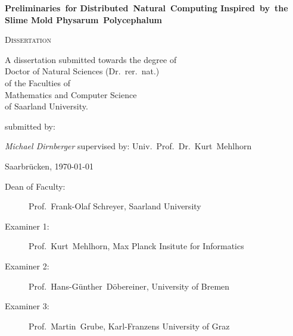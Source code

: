 
\begin{titlepage}
	\centering
	\null\vfill

	{\huge\bfseries Preliminaries~for Distributed~Natural~Computing Inspired~by~the Slime Mold Physarum~Polycephalum\par}


	\vfill

	{\scshape\Large Dissertation}
	\vfill



	{\large A dissertation submitted towards the degree of\\ 
	Doctor of Natural Sciences (Dr.~rer.~nat.)\\
	of the Faculties of\\
	Mathematics and Computer Science\\
	of Saarland University.}
	
	\vfill
	submitted by:
	\vfill

	{\Large\itshape Michael Dirnberger}
	\vfill
	supervised by:
	\vfill
	Univ.~Prof.~Dr.~Kurt~Mehlhorn

	\vfill

	{\large Saarbr\"ucken, \today}
\end{titlepage}


\newpage
\null
\vfill
\begin{description}
 	\item[Dean of Faculty:] Prof.~Frank-Olaf Schreyer, Saarland University
	\item[Examiner 1:] Prof.~Kurt~Mehlhorn, Max Planck Insitute for Informatics
	\item[Examiner 2:] Prof.~Hans-G\"unther~D\"obereiner, University of Bremen
	\item[Examiner 3:] Prof.~Martin~Grube, Karl-Franzens University of Graz
\end{description}

\newpage
